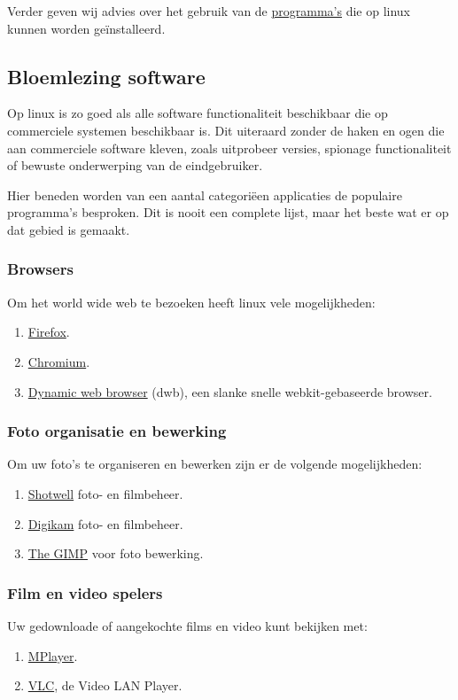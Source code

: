 Verder geven wij advies over het gebruik van de \href{https://packages.debian.org/stable/}{programma's} die op linux kunnen worden ge\"{i}nstalleerd.

\subsection{Bloemlezing software}
Op linux is zo goed als alle software functionaliteit beschikbaar die op commerciele systemen beschikbaar is. Dit uiteraard zonder de haken en ogen die aan commerciele software kleven, zoals uitprobeer versies, spionage functionaliteit of bewuste onderwerping van de eindgebruiker. 

Hier beneden worden van een aantal categori\"{e}en applicaties de populaire programma's besproken. Dit is nooit een complete lijst, maar het beste wat er op dat gebied is gemaakt.

\subsubsection{Browsers}
Om het world wide web te bezoeken heeft linux vele mogelijkheden:

\begin{enumerate}
	\item \href{https://www.mozilla.org/nl/firefox/new/}{Firefox}.
	\item \href{http://www.chromium.org/}{Chromium}.
	\item \href{http://portix.bitbucket.org/dwb/}{Dynamic web browser} (dwb), een slanke snelle webkit-gebaseerde browser.
\end{enumerate}

\subsubsection{Foto organisatie en bewerking}
Om uw foto's te organiseren en bewerken zijn er de volgende mogelijkheden:

\begin{enumerate}
	\item \href{https://wiki.gnome.org/Apps/Shotwell}{Shotwell} foto- en filmbeheer.
	\item \href{https://www.digikam.org/}{Digikam}  foto- en filmbeheer.
	\item \href{http://www.gimp.org/}{The GIMP} voor foto bewerking.
\end{enumerate}

\subsubsection{Film en video spelers}
Uw gedownloade of aangekochte films en video kunt bekijken met:
\begin{enumerate}
	\item \href{http://www.mplayer.org/}{MPlayer}.
	\item \href{http://www.videolan.org/vlc/}{VLC}, de Video LAN Player.
\end{enumerate}

